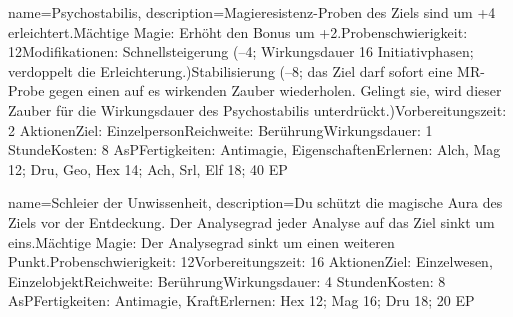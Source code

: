 {
    name={Psychostabilis},
    description={Magieresistenz-Proben des Ziels sind um +4 erleichtert.\newline Mächtige Magie: Erhöht den Bonus um +2.\newline Probenschwierigkeit: 12\newline Modifikationen: Schnellsteigerung (–4; Wirkungsdauer 16 Initiativphasen; verdoppelt die Erleichterung.)\newline Stabilisierung (–8; das Ziel darf sofort eine MR-Probe gegen einen auf es wirkenden Zauber wiederholen. Gelingt sie, wird dieser Zauber für die Wirkungsdauer des Psychostabilis unterdrückt.)\newline Vorbereitungszeit: 2 Aktionen\newline Ziel: Einzelperson\newline Reichweite: Berührung\newline Wirkungsdauer: 1 Stunde\newline Kosten: 8 AsP\newline Fertigkeiten: Antimagie, Eigenschaften\newline Erlernen: Alch, Mag 12; Dru, Geo, Hex 14; Ach, Srl, Elf 18; 40 EP}
}


{
    name={Schleier der Unwissenheit},
    description={Du schützt die magische Aura des Ziels vor der Entdeckung. Der Analysegrad jeder Analyse auf das Ziel sinkt um eins.\newline Mächtige Magie: Der Analysegrad sinkt um einen weiteren Punkt.\newline Probenschwierigkeit: 12\newline Vorbereitungszeit: 16 Aktionen\newline Ziel: Einzelwesen, Einzelobjekt\newline Reichweite: Berührung\newline Wirkungsdauer: 4 Stunden\newline Kosten: 8 AsP\newline Fertigkeiten: Antimagie, Kraft\newline Erlernen: Hex 12; Mag 16; Dru 18; 20 EP}
}


